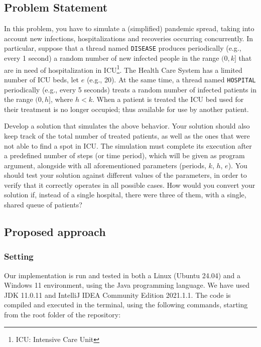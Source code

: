 \documentclass[acmlarge]{acmart}
\newcommand{\disease}{{\small \texttt{DISEASE}} }
\newcommand{\hospital}{{\small \texttt{HOSPITAL}} }
\begin{document}
\subsection{Problem Statement}
In this problem, you have to simulate a (simplified) pandemic spread, taking into account new infections, hospitalizations and recoveries occurring concurrently. In particular, suppose that a thread named \disease produces periodically (e.g., every 1 second) a random number of new infected people in the range $(0, k]$ that are in need of hospitalization in ICU\footnote{ICU: Intensive Care Unit}. The Health Care System has a limited number of ICU beds, let $e$ (e.g., 20). At the same time, a thread named \hospital periodically (e.g., every 5 seconds) treats a random number of infected patients in the range $(0, h]$, where $h<k$. When a patient is treated the ICU bed used for their treatment is no longer occupied; thus available for use by another patient.

Develop a solution that simulates the above behavior. Your solution should also keep track of the total number of treated patients, as well as the ones that were not able to find a spot in ICU. The simulation must complete its execution after a predefined number of steps (or time period), which will be given as program argument, alongside with all aforementioned parameters (periods, $k$, $h$, $e$). You should test your solution against different values of the parameters, in order to verify that it correctly operates in all possible cases. How would you convert your solution if, instead of a single hospital, there were three of them, with a single, shared queue of patients?

\subsection{Proposed approach}

\subsubsection{Setting}
Our implementation is run and tested in both a Linux (Ubuntu 24.04) and a Windows 11 environment, using the Java programming language. We have used JDK 11.0.11 and IntelliJ IDEA Community Edition 2021.1.1. The code is compiled and executed in the terminal, using the following commands, starting from the root folder of the repository:
\end{document}
